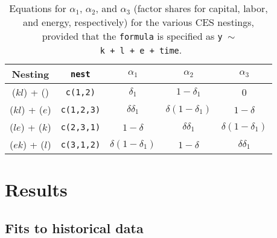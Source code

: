 \documentclass[preprint,authoryear,12pt]{elsarticle}\usepackage[]{graphicx}\usepackage[]{color}
\begin{document}
\begin{table} \caption{Equations for $\alpha_1$, $\alpha_2$, and $\alpha_3$ 
                        (factor shares for capital, labor, and energy, respectively)
                        for the various CES nestings, 
                        provided that the \texttt{formula} is specified as \texttt{y~$\sim$~k~+~l~+~e~+~time}.} 
\label{tab:CES_abg_equations} 
  \begin{center}
    \begin{tabular}{c c c c c} 
      \toprule
      Nesting         & \texttt{nest}     & $\alpha_1$              & $\alpha_2$              & $\alpha_3$       \\
      \midrule
      ($kl$) + ()     & \texttt{c(1,2)}   & $\delta_1$              & $1 - \delta_1$          & 0          \\
      ($kl$) + ($e$)  & \texttt{c(1,2,3)} & $\delta \delta_1$       & $\delta (1 - \delta_1)$ & $1 - \delta$ \\   
      ($le$) + ($k$)  & \texttt{c(2,3,1)} & $1 - \delta$            & $\delta \delta_1$       & $\delta (1 - \delta_1)$ \\
      ($ek$) + ($l$)  & \texttt{c(3,1,2)} & $\delta (1 - \delta_1)$ & $1 - \delta$            & $\delta \delta_1$ \\
      \bottomrule
    \end{tabular}
  \end{center}
\end{table}






\section{Results}
\label{sec:results}

\subsection{Fits to historical data} 
\label{sec:fits_to_historical_data}
\end{document}
